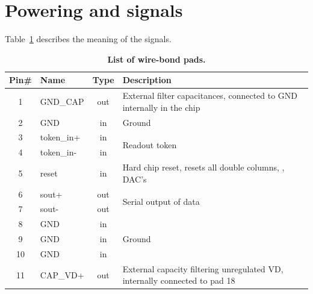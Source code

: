 \section{Powering and signals}
Table~\ref{tab:ROCpinout} describes the meaning of the signals. 
\begin{table}[h]
    \begin{center}
	\caption{\textbf{List of wire-bond pads.} }
	\label{tab:ROCpinout}

	\bigskip

	{\scriptsize
	\begin{tabular}{clcl}
	\toprule %
	Pin\# & Name         & Type & Description \\
	\midrule %
	 1 & GND\_CAP        & out & External filter capacitances, connected to GND internally in the chip \\
	\midrule %
	 2 & GND             & in  & Ground \\
	\midrule %
	 3 & token\_in+      & in  & \multirow{2}{*}{Readout token} \\
	 4 & token\_in-      & in  & \\
	\midrule %
	 5 & reset           & in  & Hard chip reset, resets all double columns, \isqc{}, DAC's \\
	\midrule %
	 6 & sout+           & out & \multirow{2}{*}{Serial output of data} \\
	 7 & sout-           & out & \\
	\midrule %
	 8 & GND             & in  & \multirow{3}{*}{Ground}  \\
	 9 & GND             & in  & \\
	10 & GND             & in  & \\
	\midrule %
	11 & CAP\_VD+        & out & External capacity filtering unregulated VD, internally connected to pad 18 \\

\end{tabular}}
\end{center}
\end{table}
